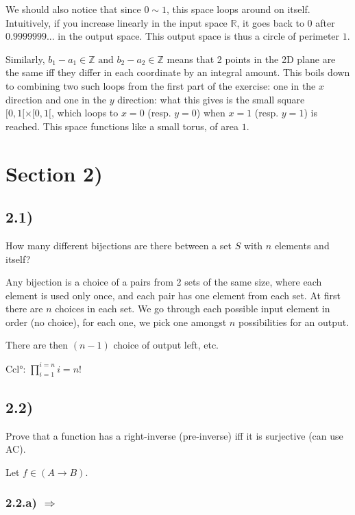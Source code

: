 \documentclass[12pt, letterpaper, twoside]{report}
\begin{document}
We should also notice that since $0 \sim 1$, this space loops around on itself. Intuitively, if you increase linearly in the input space $\mathbb{R}$, it goes back to $0$ after $0.9999999...$ in the output space. This output space is thus a circle of perimeter $1$.

Similarly, $b_1 - a_1 \in \mathbb{Z} \text{ and } b_2 - a_2 \in \mathbb{Z}$ means that 2 points in the 2D plane are the same iff they differ in each coordinate by an integral amount. This boils down to combining two such loops from the first part of the exercise: one in the $x$ direction and one in the $y$ direction: what this gives is the small square $[0, 1[ \times [0, 1[$, which loops to $x = 0$ (resp. $y = 0$) when $x = 1$ (resp. $y = 1$) is reached. This space functions like a small torus, of area $1$.
\section*{Section 2)}

\subsection*{2.1)}

How many different bijections are there between a set $S$ with $n$ elements and itself?

Any bijection is a choice of a pairs from 2 sets of the same size, where each element is used only once, and each pair has one element from each set. At first there are $n$ choices in each set. We go through each possible input element in order (no choice), for each one, we pick one amongst $n$ possibilities for an output.

There are then $(n-1)$ choice of output left, etc.

Ccl°: $\prod_{i=1}^{i=n} i = n!$



\subsection*{2.2)}

Prove that a function has a right-inverse (pre-inverse) iff it is surjective (can use AC).

Let $f \in (A \to B)$.

\subsubsection*{2.2.a) $\Rightarrow$}
\end{document}
